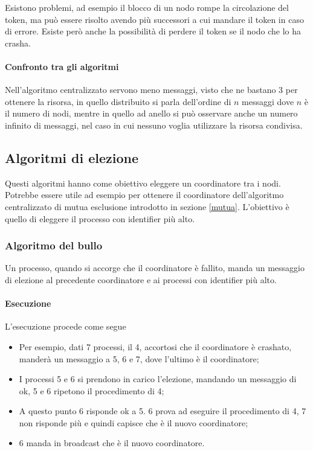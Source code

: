 Esistono problemi, ad esempio il blocco di un nodo 
rompe la circolazione del token, ma può essere risolto avendo più 
successori a cui mandare il token in caso di errore. Esiste però 
anche la possibilità di perdere il token se il nodo che lo ha crasha.

\paragraph{Confronto tra gli algoritmi}
Nell'algoritmo centralizzato servono meno messaggi, visto che ne bastano 
3 per ottenere la risorsa, in quello distribuito si parla 
dell'ordine di $n$ messaggi dove $n$ è il numero di nodi, 
mentre in quello ad anello si può osservare anche un numero 
infinito di messaggi, nel caso in cui nessuno voglia utilizzare 
la risorsa condivisa.

\subsection{Algoritmi di elezione}
Questi algoritmi hanno come obiettivo eleggere un coordinatore 
tra i nodi. 
Potrebbe essere utile ad esempio per ottenere il coordinatore dell'algoritmo 
centralizzato di mutua esclusione introdotto in sezione \vref{mutua}.
L'obiettivo è quello di eleggere il processo con identifier più alto.

\subsubsection{Algoritmo del bullo}
Un processo, quando si accorge che il coordinatore 
è fallito, manda un messaggio di elezione 
al precedente coordinatore e ai processi con identifier più alto.

\paragraph{Esecuzione}
L'esecuzione procede come segue 
\begin{itemize}
    \item Per esempio, dati 7 processi, il 4, accortosi che il coordinatore 
    è crashato, manderà un messaggio a 5, 6 e 7, dove l'ultimo è il coordinatore;
    \item I processi 5 e 6 si prendono in carico l'elezione, 
    mandando un messaggio di ok, 5 e 6 ripetono il procedimento 
    di 4;
    \item A questo punto 6 risponde ok a 5.
    6 prova ad eseguire il procedimento di 4, 7 non risponde più
    e quindi capisce che è il nuovo coordinatore;
    \item 6 manda in broadcast che è il nuovo coordinatore.
\end{itemize}

